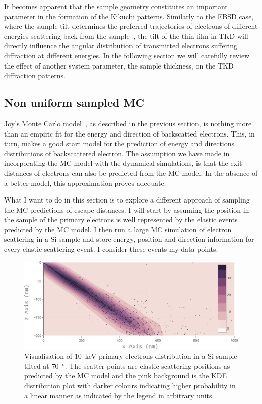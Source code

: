 It becomes apparent that the sample geometry constitutes an important parameter in the formation of the Kikuchi patterns. Similarly to the EBSD case, where the sample tilt determines the preferred trajectories of electrons of different energies scattering back from the sample~\cite{degraef2013e}, the tilt of the thin film in TKD will directly influence the angular distribution of transmitted electrons suffering diffraction at different energies. In the following section we will carefully review the effect of another system parameter, the sample thickness, on the TKD diffraction patterns. 



\subsection{Non uniform sampled MC}


Joy's Monte Carlo model~\cite{joy1995a}, as described in the previous section, is nothing more than an empiric fit for the energy and direction of backscatted electrons. This, in turn, makes a good start model for the prediction of energy and directions distributions of backscattered electron. The assumption we have made in incorporating the MC model with the dynamical simulations, is that the exit distances of electrons can also be predicted from the MC model. In the absence of a better model, this approximation proves adequate. 

What I want to do in this section is to explore a different approach of sampling the MC predictions of escape distances. I will start by assuming the position in the sample of the primary electrons is  well represented by the elastic events predicted by the MC model. I then run a large MC simulation of electron scattering in a Si sample and store energy, position and direction information for every elastic scattering event. I consider these events my data points.

\begin{figure}[ht]
\centering
\includegraphics[width=6.in]{Figures/elasticscatter.png}
\caption[Elastic scatter events distribution.]{Visualisation of \SI{10}{\kilo \electronvolt} primary electrons distribution in a Si sample tilted at \SI{70}{\degree}. The scatter points are elastic scattering positions as predicted by the MC model and the pink background is the KDE distribution plot with darker colours indicating higher probability in a linear manner as indicated by the legend in arbitrary units. }
\label{fig:elasticscatter}
\end{figure}

